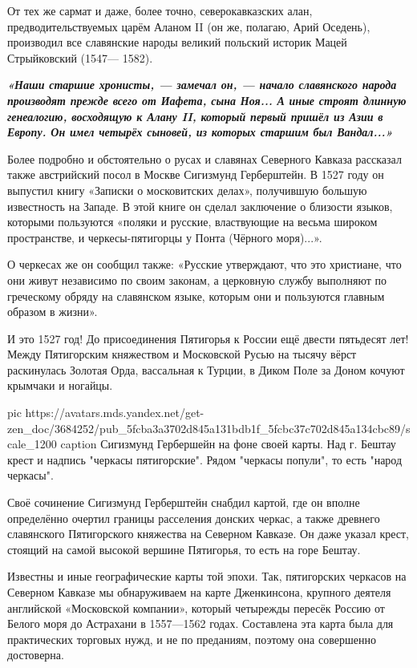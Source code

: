 От тех же сармат и даже, более точно, северокавказских алан,
предводительствуемых царём Аланом II (он же, полагаю, Арий Оседень), производил
все славянские народы великий польский историк Мацей Стрыйковский (1547— 1582). 

\begin{leftbar}
  \begingroup
    \em\large\bfseries\color{blue}
«Наши старшие хронисты, — замечал он, — начало славянского народа производят
прежде всего от Иафета, сына Ноя... А иные строят длинную генеалогию,
восходящую к Алану II, который первый пришёл из Азии в Европу. Он имел четырёх
сыновей, из которых старшим был Вандал...»
  \endgroup
\end{leftbar}

Более подробно и обстоятельно о русах и славянах Северного Кавказа рассказал
также австрийский посол в Москве Сигизмунд Герберштейн. В 1527 году он выпустил
книгу «Записки о московитских делах», получившую большую известность на Западе.
В этой книге он сделал заключение о близости языков, которыми пользуются
«поляки и русские, властвующие на весьма широком пространстве, и
черкесы-пятигорцы у Понта (Чёрного моря)...».

О черкесах же он сообщил также: «Русские утверждают, что это христиане, что они
живут независимо по своим законам, а церковную службу выполняют по греческому
обряду на славянском языке, которым они и пользуются главным образом в жизни».

И это 1527 год! До присоединения Пятигорья к России ещё двести пятьдесят лет!
Между Пятигорским княжеством и Московской Русью на тысячу вёрст раскинулась
Золотая Орда, вассальная к Турции, в Диком Поле за Доном кочуют крымчаки и
ногайцы.

\ifcmt
  pic https://avatars.mds.yandex.net/get-zen_doc/3684252/pub_5fcba3a3702d845a131bdb1f_5fcbc37c702d845a134cbc89/scale_1200
	caption Сигизмунд Гербершейн на фоне своей карты. Над г. Бештау крест и надпись "черкасы пятигорские". Рядом "черкасы попули", то есть "народ черкасы".
\fi


Своё сочинение Сигизмунд Герберштейн снабдил картой, где он вполне определённо
очертил границы расселения донских черкас, а также древнего славянского
Пятигорского княжества на Северном Кавказе. Он даже указал крест, стоящий на
самой высокой вершине Пятигорья, то есть на горе Бештау.

Известны и иные географические карты той эпохи. Так, пятигорских черкасов на
Северном Кавказе мы обнаруживаем на карте Дженкинсона, крупного деятеля
английской «Московской компании», который четырежды пересёк Россию от Белого
моря до Астрахани в 1557—1562 годах. Составлена эта карта была для практических
торговых нужд, и не по преданиям, поэтому она совершенно достоверна.


